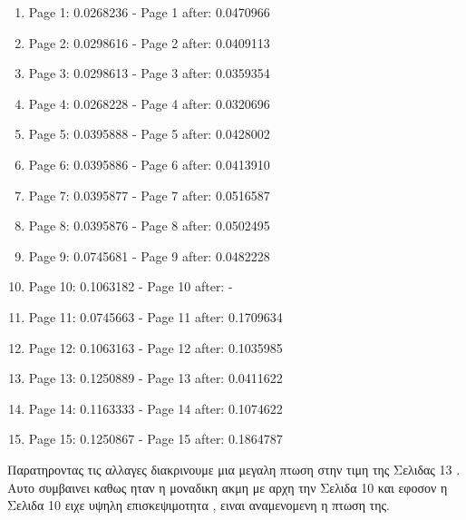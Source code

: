 \documentclass[a4paper,11pt]{article}
\begin{document}
	
	\begin{enumerate}
		\item[\text{(1)}] {Page 1: 0.0268236 - Page 1 after: 0.0470966}
		\item[\text{(2)}] {Page 2: 0.0298616 - Page 2 after: 0.0409113}
		\item[\text{(3)}] {Page 3: 0.0298613 - Page 3 after: 0.0359354}
		\item[\text{(4)}] {Page 4: 0.0268228 - Page 4 after: 0.0320696}
		\item[\text{(5)}] {Page 5: 0.0395888 - Page 5 after: 0.0428002}
		\item[\text{(6)}] {Page 6: 0.0395886 - Page 6 after: 0.0413910}
		\item[\text{(7)}] {Page 7: 0.0395877 - Page 7 after: 0.0516587}
		\item[\text{(8)}] {Page 8: 0.0395876 - Page 8 after: 0.0502495}
		\item[\text{(9)}] {Page 9: 0.0745681 - Page 9 after: 0.0482228}
		\item[\text{(10)}] {Page 10: 0.1063182 - Page 10 after: -}
		\item[\text{(11)}] {Page 11: 0.0745663 - Page 11 after: 0.1709634}
		\item[\text{(12)}] {Page 12: 0.1063163 - Page 12 after: 0.1035985}
		\item[\text{(13)}] {Page 13: 0.1250889 - Page 13 after: 0.0411622}
		\item[\text{(14)}] {Page 14: 0.1163333 - Page 14 after: 0.1074622}
		\item[\text{(15)}] {Page 15: 0.1250867 - Page 15 after: 0.1864787}
	\end{enumerate}
	
	\begin{center}
		Παρατηροντας τις αλλαγες διακρινουμε μια μεγαλη πτωση στην τιμη της Σελιδας 13 . Αυτο συμβαινει καθως ηταν η μοναδικη ακμη με αρχη την Σελιδα 10 και εφοσον η Σελιδα 10 ειχε υψηλη επισκεψιμοτητα , ειναι αναμενομενη η πτωση της. 
	\end{center}
	
	
\end{document}
